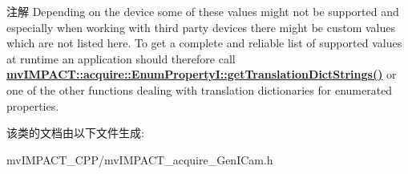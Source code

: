 \begin{DoxyNote}{注解}
Depending on the device some of these values might not be supported and especially when working with third party devices there might be custom values which are not listed here. To get a complete and reliable list of supported values at runtime an application should therefore call {\bfseries \hyperlink{classmv_i_m_p_a_c_t_1_1acquire_1_1_enum_property_i_a0ba6ccbf5ee69784d5d0b537924d26b6}{mv\+I\+M\+P\+A\+C\+T\+::acquire\+::\+Enum\+Property\+I\+::get\+Translation\+Dict\+Strings()}} or one of the other functions dealing with translation dictionaries for enumerated properties. 
\end{DoxyNote}


该类的文档由以下文件生成\+:\begin{DoxyCompactItemize}
\item 
mv\+I\+M\+P\+A\+C\+T\+\_\+\+C\+P\+P/mv\+I\+M\+P\+A\+C\+T\+\_\+acquire\+\_\+\+Gen\+I\+Cam.\+h\end{DoxyCompactItemize}
